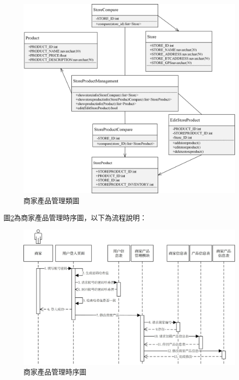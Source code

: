 	\begin{figure}[htbp]
		\centering
		\includegraphics[width = 1\textwidth]{c2.jpg}
		\caption{商家產品管理類圖}\label{c2}
	\end{figure}

	圖\ref{time3}為商家產品管理時序圖，以下為流程說明：

	\begin{figure}[htbp]
		\centering
		\includegraphics[width = 1\textwidth]{time3.jpg}
		\caption{商家產品管理時序圖}\label{time3}
	\end{figure}


